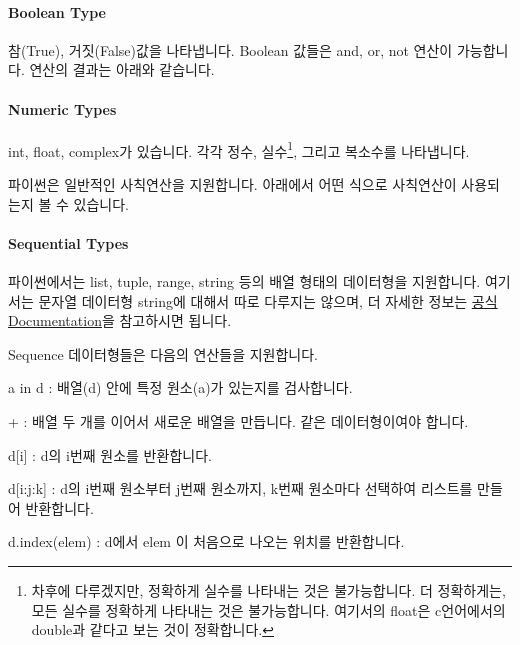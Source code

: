 \paragraph{Boolean Type} 참(True), 거짓(False)값을 나타냅니다. Boolean 값들은 and, or, not 연산이 가능합니다. 연산의 결과는 아래와 같습니다. 




\paragraph{Numeric Types} int, float, complex가 있습니다. 각각 정수, 실수\footnote{차후에 다루겠지만, 정확하게 실수를 나타내는 것은 불가능합니다. 더 정확하게는, 모든 실수를 정확하게 나타내는 것은 불가능합니다. 여기서의 float은 c언어에서의 double과 같다고 보는 것이 정확합니다.}, 그리고 복소수를 나타냅니다. 



파이썬은 일반적인 사칙연산을 지원합니다. 아래에서 어떤 식으로 사칙연산이 사용되는지 볼 수 있습니다. 




\paragraph{Sequential Types} 파이썬에서는 list, tuple, range, string 등의 배열 형태의 데이터형을 지원합니다. 여기서는 문자열 데이터형 string에 대해서 따로 다루지는 않으며, 더 자세한 정보는 \href{https://docs.python.org/3/library/stdtypes.html#sequence-types-list-tuple-range}{공식 Documentation}을 참고하시면 됩니다. 




Sequence 데이터형들은 다음의 연산들을 지원합니다. 
\begin{compactitem} 
\item a in d : 배열(d) 안에 특정 원소(a)가 있는지를 검사합니다. 
\item + : 배열 두 개를 이어서 새로운 배열을 만듭니다. 같은 데이터형이여야 합니다. 
\item d[i] : d의 i번째 원소를 반환합니다. 
\item d[i:j:k] : d의 i번째 원소부터 j번째 원소까지, k번째 원소마다 선택하여 리스트를 만들어 반환합니다. 
\item d.index(elem) : d에서 elem 이 처음으로 나오는 위치를 반환합니다. 
\end{compactitem}



